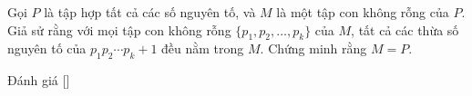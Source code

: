 \ifshowproblem
\begin{problem}\label{problem:USA-2015-TSTST-P3}
    Gọi \( P \) là tập hợp tất cả các số nguyên tố, và \( M \) là một tập con không rỗng của \( P \).  
    Giả sử rằng với mọi tập con không rỗng \( \{p_1, p_2, \ldots, p_k\} \) của \( M \),  
    tất cả các thừa số nguyên tố của \( p_1p_2\cdots p_k + 1 \) đều nằm trong \( M \).  
    Chứng minh rằng \( M = P \).
\end{problem}
\fi

\ifshowinfo
Đánh giá [\textbf{}]\footnotemark
{}
\fi
